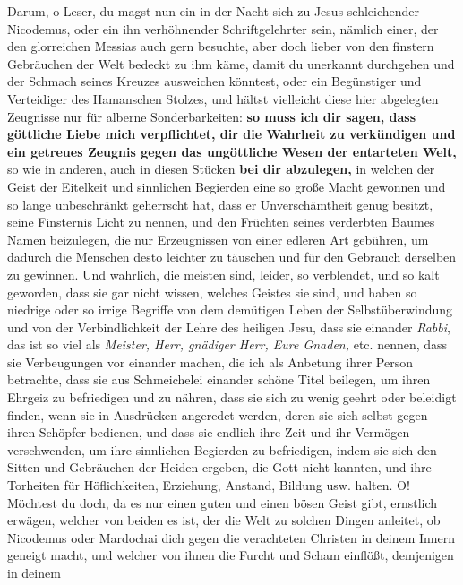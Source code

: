 Darum, o Leser, du magst nun ein in der Nacht sich zu Jesus schleichender
Nicodemus, oder ein ihn verhöhnender Schriftgelehrter
sein, nämlich einer, der
den glorreichen Messias auch gern besuchte, aber doch lieber von den finstern
Gebräuchen der Welt bedeckt zu ihm käme, damit du unerkannt durchgehen und der
Schmach seines Kreuzes ausweichen könntest, oder ein Begünstiger und Verteidiger
des Hamanschen
Stolzes, und hältst vielleicht diese hier abgelegten
Zeugnisse
nur für alberne Sonderbarkeiten: \textbf{so muss ich dir sagen, dass göttliche
Liebe mich
verpflichtet, dir die Wahrheit zu verkündigen und ein getreues
Zeugnis gegen das
ungöttliche Wesen der entarteten Welt,} so wie in anderen, auch in diesen
Stücken
\textbf{bei dir abzulegen,} in welchen der Geist der Eitelkeit und sinnlichen
Begierden
eine so große Macht gewonnen und so lange unbeschränkt geherrscht hat, dass er
Unverschämtheit genug besitzt, seine Finsternis Licht zu nennen, und den
Früchten seines verderbten Baumes Namen beizulegen, die nur Erzeugnissen von
einer edleren Art gebühren, um dadurch die Menschen desto leichter zu täuschen
und für den Gebrauch derselben zu gewinnen. Und wahrlich, die meisten sind,
leider, so verblendet, und so kalt geworden, dass sie gar nicht wissen,
welches Geistes sie sind, und haben so niedrige oder so irrige Begriffe von dem
demütigen Leben der Selbstüberwindung und
von der Verbindlichkeit der Lehre des
heiligen Jesu, dass sie einander \textit{Rabbi}, das ist so viel als
\textit{Meister,
Herr, gnädiger Herr, Eure Gnaden,} etc. nennen, dass sie Verbeugungen vor
einander machen, die ich als Anbetung ihrer Person betrachte, dass sie aus
Schmeichelei einander schöne Titel beilegen, um ihren Ehrgeiz zu befriedigen und
zu nähren, dass sie sich zu wenig geehrt oder beleidigt finden, wenn sie in
Ausdrücken angeredet werden, deren sie sich selbst gegen ihren Schöpfer
bedienen, und dass sie endlich ihre Zeit und ihr Vermögen verschwenden, um ihre
sinnlichen Begierden zu befriedigen, indem sie sich den Sitten und Gebräuchen
der Heiden ergeben, die Gott nicht kannten, und ihre Torheiten für
Höflichkeiten, Erziehung, Anstand, Bildung usw. halten. O! Möchtest
du doch, da es nur einen guten und einen bösen Geist gibt, ernstlich erwägen,
welcher von beiden es ist, der die Welt zu solchen Dingen anleitet, ob Nicodemus
oder Mardochai dich gegen die verachteten Christen in
deinem Innern geneigt
macht, und welcher von ihnen die Furcht und Scham einflößt, demjenigen in deinem

